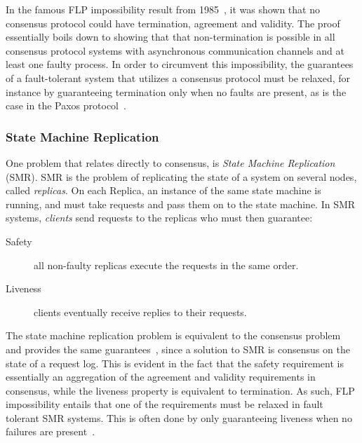 \documentclass{article}
\begin{document}
		In the famous FLP impossibility result from 1985~\cite{fischer_impossibility_1985}, it was shown that no consensus protocol could have termination, agreement and validity.
		The proof essentially boils down to showing that that non-termination is possible in all consensus protocol systems with asynchronous communication channels and at least one faulty process.
		In order to circumvent this impossibility, the guarantees of a fault-tolerant system that utilizes a consensus protocol must be relaxed, for instance by guaranteeing termination only when no faults are present, as is the case in the Paxos protocol~\cite{lamport_part-time_1998}.

		\subsubsection{State Machine Replication}

		One problem that relates directly to consensus, is \textit{State Machine Replication}~\cite{schneider_implementing_1990} (SMR).
		SMR is the problem of replicating the state of a system on several nodes, called \textit{replicas}.
		On each Replica, an instance of the same state machine is running, and must take requests and pass them on to the state machine.
		In SMR systems, \textit{clients} send requests to the replicas who must then guarantee:
		\begin{description}
			\item[Safety] all non-faulty replicas execute the requests in the same order.
			\item[Liveness] clients eventually receive replies to their requests.
		\end{description}
		The state machine replication problem is equivalent to the consensus problem and provides the same guarantees~\cite{schneider_implementing_1990}, since a solution to SMR is consensus on the state of a request log.
		This is evident in the fact that the safety requirement is essentially an aggregation of the agreement and validity requirements in consensus, while the liveness property is equivalent to termination.
		As such, FLP impossibility entails that one of the requirements must be relaxed in fault tolerant SMR systems.
		This is often done by only guaranteeing liveness when no failures are present~\cite{chandra_unreliable_1996,lamport_part-time_1998,castro_practical_1999,kotla_zyzzyva_2007}.
\end{document}
